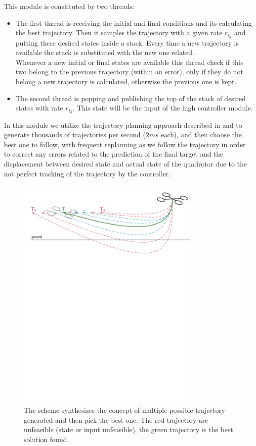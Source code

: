 This module is constituted by two threads:
\begin{itemize}
\item The first thread is receiving the initial and final conditions and its calculating the best trajectory. Then it samples the trajectory with a given rate $r_{tj}$ and putting these desired states inside a stack. Every time a new trajectory is available the stack is substituted with the new one related.\\ Whenever a new initial or final states are available this thread check if this two belong to the previous trajectory (within an error), only if they do not belong a new trajectory is calculated, otherwise the previous one is kept.
\item The second thread is popping and publishing the top of the stack of desired states with rate $r_{tj}$. This state will be the input of the high controller module.
\end{itemize}

In this module we utilize the trajectory planning approach described in \cite{mueller2013model} and \cite{mueller2015computationally} to generate thousands of trajectories per second ($2ms$ each), and then choose the best one to follow, with frequent replanning as we follow the trajectory in order to correct any errors related to the prediction of the final target and the displacement between desired state and actual state of the quadrotor due to the not perfect tracking of the trajectory by the controller.\\

\begin{figure}[!htbp]
    \centering
    \includegraphics[width=0.8\textwidth]{img/trajectory_generation.pdf}
    \caption{The scheme synthesizes the concept of multiple possible trajectory generated and then pick the best one. The red trajectory are unfeasible (state or input unfeasible), the green trajectory is the best solution found.}
    \label{fig:traject_gen}
\end{figure}

